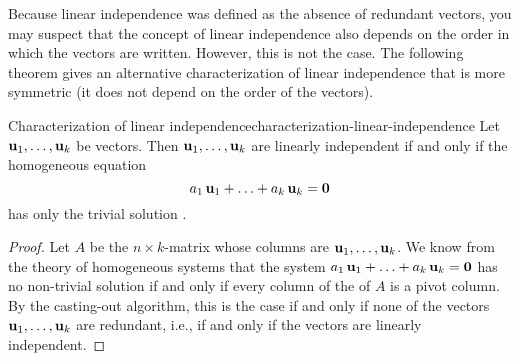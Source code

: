 Because linear independence was defined as the absence of redundant
vectors, you may suspect that the concept of linear independence also
depends on the order in which the vectors are written. However, this
is not the case. The following theorem gives an alternative
characterization of linear independence that is more symmetric (it
does not depend on the order of the vectors).

\begin{theorem}{Characterization of linear independence}{characterization-linear-independence}
  Let $\mbox{\bf u}_1,\ldots,\mbox{\bf u}_k$ be vectors. Then
  $\mbox{\bf u}_1,\ldots,\mbox{\bf u}_k$ are linearly independent%
   if
  and only if the homogeneous equation
  \begin{equation*}
    a_1\,\mbox{\bf u}_1 + \ldots + a_k\,\mbox{\bf u}_k = \mbox{\bf 0}
  \end{equation*}
  has only the trivial solution%
  .
\end{theorem}

\begin{proof}
  Let $A$ be the $n\times k$-matrix whose columns are
  $\mbox{\bf u}_1,\ldots,\mbox{\bf u}_k$. We know from the theory of
  homogeneous systems that the system
  $a_1\,\mbox{\bf u}_1 + \ldots + a_k\,\mbox{\bf u}_k = \mbox{\bf 0}$ has no
  non-trivial solution if and only if every column of the {\ef} of $A$
  is a pivot column. By the casting-out algorithm, this is the case if
  and only if none of the vectors $\mbox{\bf u}_1,\ldots,\mbox{\bf u}_k$ are
  redundant, i.e., if and only if the vectors are linearly independent.
\end{proof}

